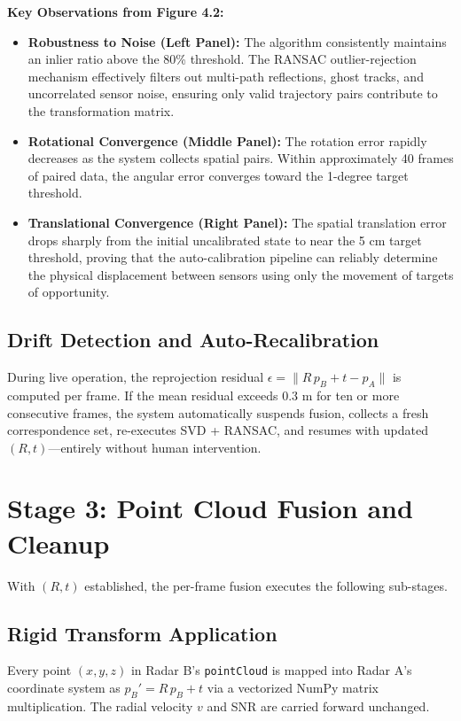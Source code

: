 \textbf{Key Observations from Figure 4.2:}
\begin{itemize}
    \item \textbf{Robustness to Noise (Left Panel):} The algorithm consistently maintains an inlier ratio above the 80\% threshold. The RANSAC outlier-rejection mechanism effectively filters out multi-path reflections, ghost tracks, and uncorrelated sensor noise, ensuring only valid trajectory pairs contribute to the transformation matrix.
    \item \textbf{Rotational Convergence (Middle Panel):} The rotation error rapidly decreases as the system collects spatial pairs. Within approximately 40 frames of paired data, the angular error converges toward the 1-degree target threshold.
    \item \textbf{Translational Convergence (Right Panel):} The spatial translation error drops sharply from the initial uncalibrated state to near the 5 cm target threshold, proving that the auto-calibration pipeline can reliably determine the physical displacement between sensors using only the movement of targets of opportunity.
\end{itemize}

\subsection{Drift Detection and Auto-Recalibration}

During live operation, the reprojection residual $\epsilon = \| R\,p_B + t - p_A \|$ is computed per frame. If the mean residual exceeds 0.3 m for ten or more consecutive frames, the system automatically suspends fusion, collects a fresh correspondence set, re-executes SVD + RANSAC, and resumes with updated $(R, t)$---entirely without human intervention.

\section{Stage 3: Point Cloud Fusion and Cleanup}

With $(R, t)$ established, the per-frame fusion executes the following sub-stages.

\subsection{Rigid Transform Application}

Every point $(x, y, z)$ in Radar B's \texttt{pointCloud} is mapped into Radar A's coordinate system as $p_B' = R\,p_B + t$ via a vectorized NumPy matrix multiplication. The radial velocity $v$ and SNR are carried forward unchanged.

